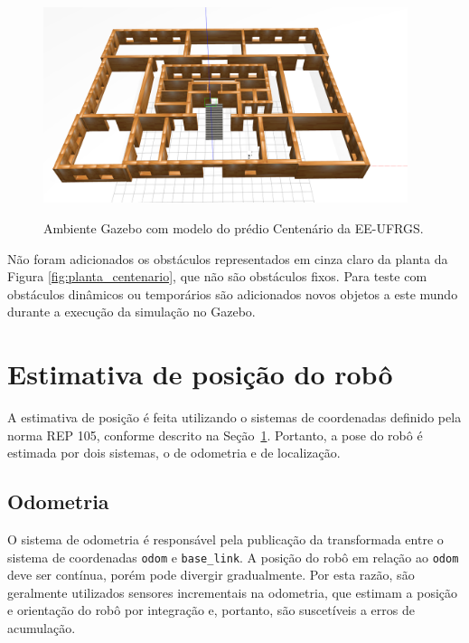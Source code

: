 \documentclass[repeatfields,xlists,xpacks,oneside,yearsonly]{ufrgscca}
\begin{document}
\begin{figure}[h]
    {
        \centering
        \caption{Ambiente Gazebo com modelo do prédio Centenário da EE-UFRGS.}
        \label{fig:gazebo_centenario}
        \includegraphics[width=0.95\textwidth]{gazebo.png}\\
    }
\end{figure}

Não foram adicionados os obstáculos representados em cinza claro da
planta da Figura \ref{fig:planta_centenario}, que não são obstáculos
fixos. Para teste com obstáculos dinâmicos ou temporários são
adicionados novos objetos a este mundo durante a execução da
simulação no Gazebo.

\section{Estimativa de posição do robô}
\label{bib:estimativa_posicao}

A estimativa de posição é feita utilizando o sistemas de coordenadas
definido pela norma REP 105, conforme descrito na
Seção~\ref{bib:estimativa_posicao}. Portanto, a pose do robô é
estimada por dois sistemas, o de odometria e de localização.

\subsection{Odometria}
\label{met:odometria}

O sistema de odometria é responsável pela publicação da transformada
entre o sistema de coordenadas \texttt{odom} e \texttt{base\_link}. A
posição do robô em relação ao \texttt{odom} deve ser contínua, porém
pode divergir gradualmente. Por esta razão, são geralmente utilizados
sensores incrementais na odometria, que estimam a posição e
orientação do robô por integração e, portanto, são suscetíveis a
erros de acumulação. 
\end{document}
